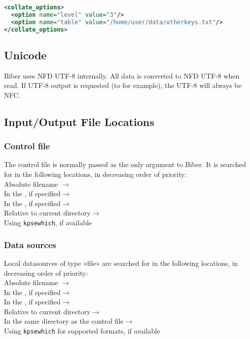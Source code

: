 \documentclass{ltxdockit}
\newcommand*{\biber}{Biber\xspace}
\begin{document}
\begin{lstlisting}[language=xml]
<collate_options>
  <option name="level" value="3"/>
  <option name="table" value="/home/user/data/otherkeys.txt"/>
</collate_options>
\end{lstlisting}
\bigskip
\subsection{Unicode}
\biber uses NFD UTF-8 internally. All data is converted to NFD UTF-8
when read. If UTF-8 output is requested (to  for example),
the UTF-8 will always be NFC.
\bigskip
\subsection{Input/Output File Locations}

\subsubsection{Control file}\label{loc:cf}

The control file is normally passed as the only argument to \biber. It is
searched for in the following locations, in decreasing order of
priority:\\[2ex]

\noindent Absolute filename $\rightarrow$\\
\hspace*{1em}In the , if specified$\rightarrow$\\
\hspace*{2em}In the , if specified$\rightarrow$\\
\hspace*{3em}Relative to current directory$\rightarrow$\\
\hspace*{4em}Using \verb+kpsewhich+, if available

\subsubsection{Data sources}

Local datasources of type «file» are searched for in the following
locations, in decreasing order of priority:\\[2ex]

\noindent Absolute filename $\rightarrow$\\
\hspace*{1em}In the , if specified$\rightarrow$\\
\hspace*{2em}In the , if specified$\rightarrow$\\
\hspace*{3em}Relative to current directory$\rightarrow$\\
\hspace*{4em}In the same directory as the control file$\rightarrow$\\
\hspace*{5em}Using \verb+kpsewhich+ for supported formats, if available\\[2ex]
\end{document}
